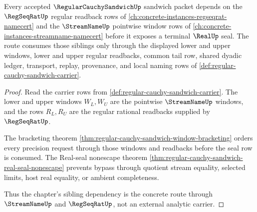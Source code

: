 \begin{theorem}
\label{thm:regular-cauchy-sandwich-sibling-dependency-route}
Every accepted $\RegularCauchySandwichUp$ sandwich packet depends on the $\RegSeqRatUp$ regular readback rows of \autoref{ch:concrete-instances-regseqrat-namecert} and the $\StreamNameUp$ pointwise window rows of \autoref{ch:concrete-instances-streamname-namecert} before it exposes a terminal $\RealUp$ seal. The route consumes those siblings only through the displayed lower and upper windows, lower and upper regular readbacks, common tail row, shared dyadic ledger, transport, replay, provenance, and local naming rows of \autoref{def:regular-cauchy-sandwich-carrier}.
\end{theorem}
\begin{proof}
Read the carrier rows from \autoref{def:regular-cauchy-sandwich-carrier}. The lower and upper windows $W_L,W_U$ are the pointwise $\StreamNameUp$ windows, and the rows $R_L,R_U$ are the regular rational readbacks supplied by $\RegSeqRatUp$.

The bracketing theorem \autoref{thm:regular-cauchy-sandwich-window-bracketing} orders every precision request through those windows and readbacks before the seal row is consumed. The Real-seal nonescape theorem \autoref{thm:regular-cauchy-sandwich-real-seal-nonescape} prevents bypass through quotient stream equality, selected limits, host real equality, or ambient completeness.

Thus the chapter's sibling dependency is the concrete route through $\StreamNameUp$ and $\RegSeqRatUp$, not an external analytic carrier.
\end{proof}
